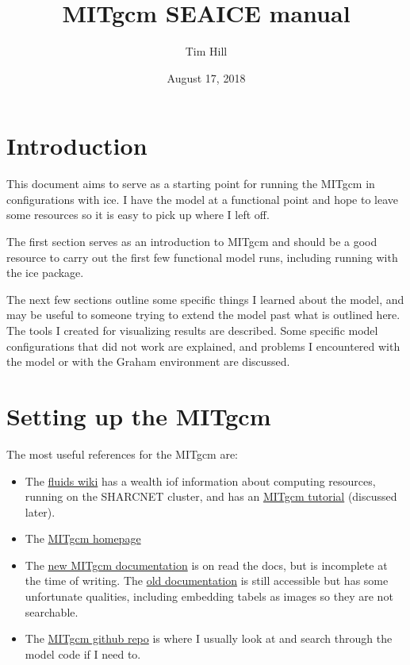 \documentclass[11pt]{article}
\title{MITgcm SEAICE manual}
\author{Tim Hill}
\date{August 17, 2018}
\begin{document}
\maketitle

\tableofcontents{}

\section{Introduction}

This document aims to serve as a starting point for running the MITgcm in configurations with ice. I have the model at a functional point and hope to leave some resources so it is easy to pick up where I left off.

The first section serves as an introduction to MITgcm and should be a good resource to carry out the first few functional model runs, including running with the ice package.

The next few sections outline some specific things I learned about the model, and may be useful to someone trying to extend the model past what is outlined here. The tools I created for visualizing results are described. Some specific model configurations that did not work are explained, and problems I encountered with the model or with the Graham environment are discussed.

\section{Setting up the MITgcm}
The most useful references for the MITgcm are:
\begin{itemize}
\item{The \href{https://wiki.math.uwaterloo.ca/fluidswiki/index.php?title=Main_Page}{fluids wiki} has a wealth iof information about computing resources, running on the SHARCNET cluster, and has an \href{https://wiki.math.uwaterloo.ca/fluidswiki/index.php?title=MITgcmTutorial}{MITgcm tutorial} (discussed later).}
\item{The \href{http://mitgcm.org}{MITgcm homepage}}
\item{The \href{https://mitgcm.readthedocs.io/en/latest/}{new MITgcm documentation} is on read the docs, but is incomplete at the time of writing. The \href{http://mitgcm.org/public/r2_manual/final/online_documents/node1.html}{old documentation} is still accessible but has some unfortunate qualities, including embedding tabels as images so they are not searchable.}
\item{The \href{https://github.com/MITgcm/MITgcm}{MITgcm github repo} is where I usually look at and search through the model code if I need to.}
\end{itemize}
\end{document}
